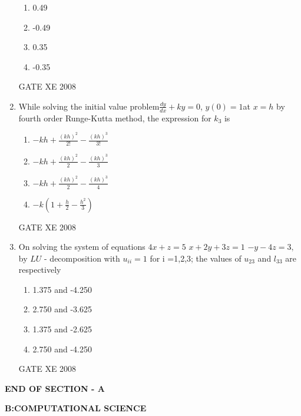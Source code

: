 \documentclass[12pt]{article}
\begin{document}
\begin{enumerate}[label=Q\arabic*.]
\begin{enumerate}[label=(\Alph*)]
\item 0.49
\item -0.49
\item  0.35
\item -0.35
\end{enumerate}

GATE XE 2008
\item While solving the initial value problem\newline $\frac{dy}{dx}+ky=0$, $y(0)=1$\newline at $x = h$ by fourth order Runge-Kutta method, the expression for $k_3$ is

\begin{enumerate}[label=(\Alph*)]
\item  $-kh + \frac{(kh)^2}{2!} -\frac{(kh)^3}{3!}$
\item   $-kh + \frac{(kh)^2}{2} -\frac{(kh)^3}{3}$
\item   $-kh + \frac{(kh)^2}{2} -\frac{(kh)^3}{4}$
\item   $-k(1+\frac{h}{2}-\frac{h^2}{3})$
\end{enumerate}

GATE XE 2008
\item  On solving the system of equations\newline
$4x+z =5$\newline
$x+2y+3z =1$\newline
$-y-4z=3,$\newline
by $LU$ - decomposition with $u_{ii} =1$ for i =1,2,3; the values of $u_{23}$ and $l_{33}$ are respectively

\begin{enumerate}[label=(\Alph*)]
\item  1.375 and -4.250
\item  2.750 and -3.625
\item  1.375 and -2.625
\item 2.750 and -4.250
\end{enumerate}

GATE XE 2008\


\end{enumerate}
    
 

\begin{center}
   
    \textbf{END OF SECTION - A}
\end{center}
\newpage
\begin{center}
    \textbf{B:COMPUTATIONAL SCIENCE}
\end{center}
\end{document}

